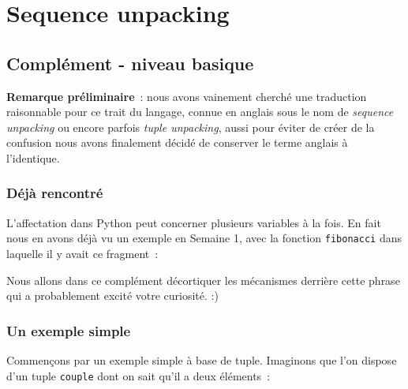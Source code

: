     \hypertarget{sequence-unpacking}{%
\section{Sequence unpacking}\label{sequence-unpacking}}

    \hypertarget{compluxe9ment---niveau-basique}{%
\subsection{Complément - niveau
basique}\label{compluxe9ment---niveau-basique}}

    \textbf{Remarque préliminaire}~: nous avons vainement cherché une
traduction raisonnable pour ce trait du langage, connue en anglais sous
le nom de \emph{sequence unpacking} ou encore parfois \emph{tuple
unpacking}, aussi pour éviter de créer de la confusion nous avons
finalement décidé de conserver le terme anglais à l'identique.

    \hypertarget{duxe9juxe0-rencontruxe9}{%
\subsubsection{Déjà rencontré}\label{duxe9juxe0-rencontruxe9}}

    L'affectation dans Python peut concerner plusieurs variables à la fois.
En fait nous en avons déjà vu un exemple en Semaine 1, avec la fonction
\texttt{fibonacci} dans laquelle il y avait ce fragment~:

\begin{Shaded}
\begin{Highlighting}[]
 \NormalTok{(}\OperatorTok{+} \NormalTok{):}
\OperatorTok{=}\OperatorTok{+}
\end{Highlighting}
\end{Shaded}

Nous allons dans ce complément décortiquer les mécanismes derrière cette
phrase qui a probablement excité votre curiosité. :)

    \hypertarget{un-exemple-simple}{%
\subsubsection{Un exemple simple}\label{un-exemple-simple}}

    Commençons par un exemple simple à base de tuple. Imaginons que l'on
dispose d'un tuple \texttt{couple} dont on sait qu'il a deux éléments~:

